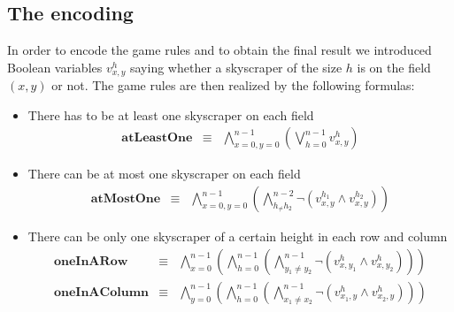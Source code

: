 \documentclass[a4paper, 12pt, titlepage]{article}
\begin{document}
\subsection{The encoding}
In order to encode the game rules and to obtain the final result we introduced Boolean variables $v_{x,y}^h$ saying whether a skyscraper of the size $h$ is on the field $(x,y)$ or not. The game rules are then realized by the following formulas:
	\begin{itemize}
		\item There has to be at least one skyscraper on each field
			\begin{eqnarray}
				\pmb{atLeastOne}&\equiv&\bigwedge_{x=0,y=0}^{n-1} \left(\bigvee_{h=0}^{n-1} v_{x,y}^h \right)
			\end{eqnarray}
		\item There can be at most one skyscraper on each field
			\begin{eqnarray}
				\pmb{atMostOne}&\equiv&\bigwedge_{x=0,y=0}^{n-1} \left( \bigwedge_{h_\not=h_2}^{n-2}\neg(v_{x,y}^{h_1} \wedge v_{x,y}^{h_2})  \right)
			\end{eqnarray}
		\item There can be only one skyscraper of a certain height in each row and column
			\begin{eqnarray}
				\pmb{oneInARow} &\equiv& \bigwedge_{x=0}^{n-1} \left( \bigwedge_{h=0}^{n-1} \left( \bigwedge_{y_1 \not = y_2}^{n-1} \neg(v_{x,y_1}^h \wedge v_{x,y_2}^h) \right) \right) \\
				\pmb{oneInAColumn} &\equiv&  \bigwedge_{y=0}^{n-1} \left( \bigwedge_{h=0}^{n-1} \left( \bigwedge_{x_1 \not = x_2}^{n-1} \neg(v_{x_1,y}^h \wedge v_{x_2,y}^h) \right) \right)
			\end{eqnarray}
	\end{itemize}
\end{document}
